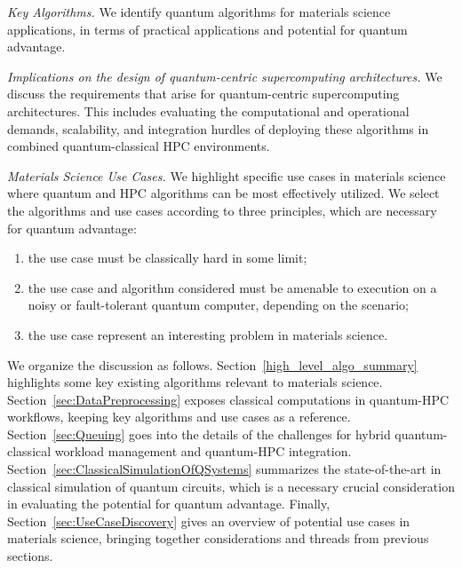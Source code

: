 \emph{Key Algorithms.} We identify quantum algorithms for materials science applications, in terms of practical applications and potential for quantum advantage. 
    
\emph{Implications on the design of quantum-centric supercomputing architectures.} We discuss the requirements that arise for quantum-centric supercomputing architectures. This includes evaluating the computational and operational demands, scalability, and integration hurdles of deploying these algorithms in combined quantum-classical HPC environments.
    
\emph{Materials Science Use Cases.} We highlight specific use cases in materials science where quantum and HPC algorithms can be most effectively utilized. 
We select the algorithms and use cases according to three principles, which are necessary for quantum advantage:
\begin{enumerate}
    \item the use case must be classically hard in some limit;
    \item the use case and algorithm considered must be amenable to execution on a noisy or fault-tolerant quantum computer, depending on the scenario;
    \item the use case represent an interesting problem in materials science.
\end{enumerate}

We organize the discussion as follows.
Section~\ref{high_level_algo_summary} highlights some key  existing algorithms relevant to materials science.
Section~\ref{sec:DataPreprocessing} exposes classical computations in quantum-HPC workflows, keeping key algorithms and use cases as a reference.
Section~\ref{sec:Queuing} goes into the details of the challenges for hybrid quantum-classical workload management and quantum-HPC integration.
Section~\ref{sec:ClassicalSimulationOfQSystems} summarizes the state-of-the-art in classical simulation of quantum circuits, which is a necessary crucial consideration in evaluating the potential for quantum advantage.
Finally, Section~\ref{sec:UseCaseDiscovery} gives an overview of potential use cases in materials science, bringing together considerations and threads from previous sections. 
